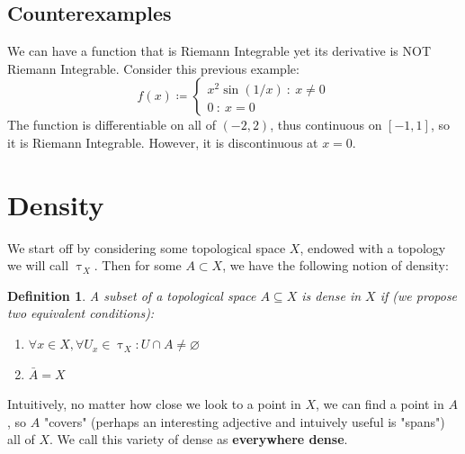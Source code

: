 \documentclass[10pt,letterpaper]{article} %
\newtheorem{defn}{Definition}[section]
\begin{document}
\subsection{Counterexamples}
We can have a function that is Riemann Integrable yet its derivative is NOT Riemann Integrable. Consider this previous example:
\begin{equation*}
f(x) \coloneq \begin{cases*}
  x^2\sin(1/x) \ : \ x \neq 0\\
  0 \ : \ x = 0
\end{cases*}
\end{equation*}
The function is differentiable on all of $(-2, 2)$, thus continuous on $[-1, 1]$, so it is Riemann Integrable. However, it is discontinuous at $x = 0$.
\pagebreak
\section{Density}
We start off by considering some topological space $X$, endowed with a topology we will call $\uptau_X$. Then for some $A \subset X$, we have the following notion of density:
\begin{defn}
A subset of a topological space $A \subseteq X$ is dense in $X$ if (we propose two equivalent conditions):
\begin{enumerate}
  \item $\forall x \in X, \forall U_x \in \uptau_X: U \cap A \neq \varnothing$
  \item $\bar{A} = X$
\end{enumerate}

\end{defn}
Intuitively, no matter how close we look to a point in $X$, we can find a point in $A$, so $A$ "covers" (perhaps an interesting adjective and intuively useful is "spans") all of $X$. We call this variety of dense as \textbf{everywhere dense}.\\
\end{document}
